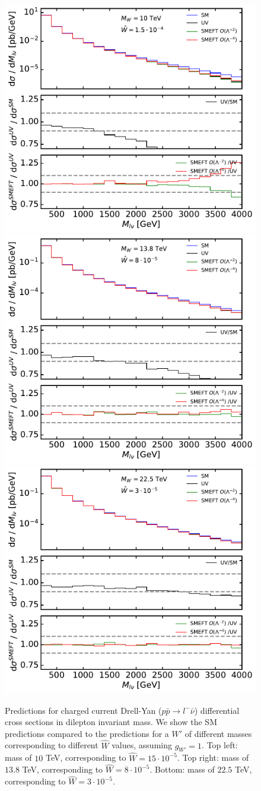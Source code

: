 \documentclass[withindex,glossary]{cam-thesis}
\begin{document}
\begin{figure}[H]
    \centering
	\includegraphics[width=0.49\linewidth]{Figures/Wp_10TeV_W_0.00015.pdf}
	\includegraphics[width=0.49\linewidth]{Figures/Wp_13.76TeV_W_0.00008.pdf}\\
	\includegraphics[width=0.49\linewidth]{Figures/Wp_22.48TeV_W_0.00003.pdf}
	\caption{Predictions for charged current Drell-Yan ($p \bar{p} \rightarrow l^- \bar{\nu}$) differential cross sections in dilepton invariant mass.  We show the SM predictions compared to the predictions for a $W'$ of different masses corresponding to different $\hat{W}$ values, assuming $g_{W'}=1$. Top left: mass of $10$ TeV, corresponding to $\hat{W}=15 \cdot 10^{-5}$. Top right: mass of $13.8$ TeV, corresponding to $\hat{W}=8 \cdot 10^{-5}$. Bottom: mass of $22.5$ TeV, corresponding to 
    $\hat{W}=3 \cdot 10^{-5}$.}
 	\label{fig:Wp_DY_Comp}
\end{figure}
\end{document}
